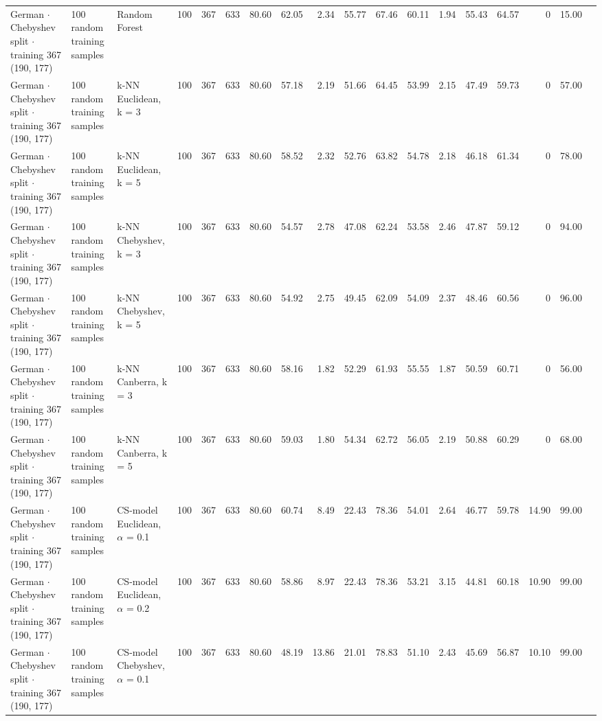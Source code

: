 \begin{longtable}{lllrrrrrrrrrrrrrrl}
  German $\cdot$ Chebyshev split $\cdot$ training 367 (190, 177) & 100 random training samples & Random Forest & 100 & 367 & 633 & 80.60 & 62.05 & 2.34 & 55.77 & 67.46 & 60.11 & 1.94 & 55.43 & 64.57 & 0 & 15.00 &  \\
  German $\cdot$ Chebyshev split $\cdot$ training 367 (190, 177) & 100 random training samples & k-NN Euclidean, k = 3 & 100 & 367 & 633 & 80.60 & 57.18 & 2.19 & 51.66 & 64.45 & 53.99 & 2.15 & 47.49 & 59.73 & 0 & 57.00 &  \\
  German $\cdot$ Chebyshev split $\cdot$ training 367 (190, 177) & 100 random training samples & k-NN Euclidean, k = 5 & 100 & 367 & 633 & 80.60 & 58.52 & 2.32 & 52.76 & 63.82 & 54.78 & 2.18 & 46.18 & 61.34 & 0 & 78.00 &  \\
  German $\cdot$ Chebyshev split $\cdot$ training 367 (190, 177) & 100 random training samples & k-NN Chebyshev, k = 3 & 100 & 367 & 633 & 80.60 & 54.57 & 2.78 & 47.08 & 62.24 & 53.58 & 2.46 & 47.87 & 59.12 & 0 & 94.00 &  \\
  German $\cdot$ Chebyshev split $\cdot$ training 367 (190, 177) & 100 random training samples & k-NN Chebyshev, k = 5 & 100 & 367 & 633 & 80.60 & 54.92 & 2.75 & 49.45 & 62.09 & 54.09 & 2.37 & 48.46 & 60.56 & 0 & 96.00 &  \\
  German $\cdot$ Chebyshev split $\cdot$ training 367 (190, 177) & 100 random training samples & k-NN Canberra, k = 3 & 100 & 367 & 633 & 80.60 & 58.16 & 1.82 & 52.29 & 61.93 & 55.55 & 1.87 & 50.59 & 60.71 & 0 & 56.00 &  \\
  German $\cdot$ Chebyshev split $\cdot$ training 367 (190, 177) & 100 random training samples & k-NN Canberra, k = 5 & 100 & 367 & 633 & 80.60 & 59.03 & 1.80 & 54.34 & 62.72 & 56.05 & 2.19 & 50.88 & 60.29 & 0 & 68.00 &  \\
  German $\cdot$ Chebyshev split $\cdot$ training 367 (190, 177) & 100 random training samples & CS-model Euclidean, $\alpha$ = 0.1 & 100 & 367 & 633 & 80.60 & 60.74 & 8.49 & 22.43 & 78.36 & 54.01 & 2.64 & 46.77 & 59.78 & 14.90 & 99.00 &  \\
  German $\cdot$ Chebyshev split $\cdot$ training 367 (190, 177) & 100 random training samples & CS-model Euclidean, $\alpha$ = 0.2 & 100 & 367 & 633 & 80.60 & 58.86 & 8.97 & 22.43 & 78.36 & 53.21 & 3.15 & 44.81 & 60.18 & 10.90 & 99.00 &  \\
  German $\cdot$ Chebyshev split $\cdot$ training 367 (190, 177) & 100 random training samples & CS-model Chebyshev, $\alpha$ = 0.1 & 100 & 367 & 633 & 80.60 & 48.19 & 13.86 & 21.01 & 78.83 & 51.10 & 2.43 & 45.69 & 56.87 & 10.10 & 99.00 &  \\

\end{longtable}
